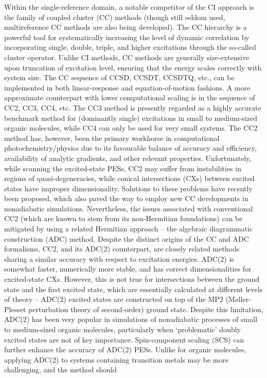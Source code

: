 \documentclass[9pt,bestpractices]{livecoms}
\begin{document}
Within the single-reference domain, a notable competitor of the CI approach is the family of coupled cluster (CC) methods (though still seldom used, multireference CC methods are also being developed\cite{evangelista2018perspective}). The CC hierarchy is a powerful tool for systematically increasing the level of dynamic correlation by incorporating single, double, triple, and higher excitations through the so-called cluster operator. Unlike CI methods, CC methods are generally size-extensive upon truncation of excitation level, ensuring that the energy scales correctly with system size. The CC sequence of CCSD, CCSDT, CCSDTQ, etc., can be implemented in both linear-response and equation-of-motion fashions.\cite{watts2008introduction,krylov_equation--motion_2008} A more approximate counterpart with lower computational scaling is in the sequence of CC2, CC3, CC4, etc.\cite{sneskov2012excited} The CC3 method is presently regarded as a highly accurate benchmark method for (dominantly single) excitations in small to medium-sized organic molecules,\cite{loos2020adc} while CC4 can only be used for very small systems.\cite{loos2022mountaineering} The CC2 method has, however, been the primary workhorse in computational photochemistry/physics due to its favourable balance of accuracy and efficiency, availability of analytic gradients,\cite{kohn2003analytic} and other relevant properties. Unfortunately, while scanning the excited-state PESs, CC2 may suffer from instabilities in regions of quasi-degeneracies,\cite{plasser2014surface,parker2016unphysical} while conical intersections (CXs) between excited states have improper dimensionality\cite{tuna2015assessment}. Solutions to these problems have recently been proposed,\cite{kjonstad2017crossing,kjonstad2017resolving} which also paved the way to employ new CC developments in nonadiabatic simulations.\cite{kjonstad2024photoinduced,hait2024prediction} Nevertheless, the issues associated with conventional CC2 (which are known to stem from its non-Hermitian foundations) can be mitigated by using a related Hermitian approach -- the algebraic diagrammatic construction (ADC) method. Despite the distinct origins of the CC and ADC formalisms, CC2, and its ADC(2) counterpart, are closely related methods\cite{hattig2005structure} sharing a similar accuracy with respect to excitation energies. ADC(2) is somewhat faster, numerically more stable,\cite{plasser2014surface} and has correct dimensionalities for excited-state CXs.\cite{tuna2015assessment,taylor2023description} However, this is not true for intersections between the ground state and the first excited state\cite{tuna2015assessment,taylor2023description}, which are essentially calculated at different levels of theory  -- ADC(2) excited states are constructed on top of the MP2 (M\o ller-Plesset perturbation theory of second-order) ground state. Despite this limitation, ADC(2) has been very popular in simulations of nonadiabatic processes of small to medium-sized organic molecules, particularly when `problematic' doubly excited states are not of key importance. Spin-component scaling (SCS) can further enhance the accuracy of ADC(2) PESs.\cite{tajti2019accuracy} Unlike for organic molecules, applying ADC(2) to systems containing transition metals may be more challenging, and the method should 
\end{document}
